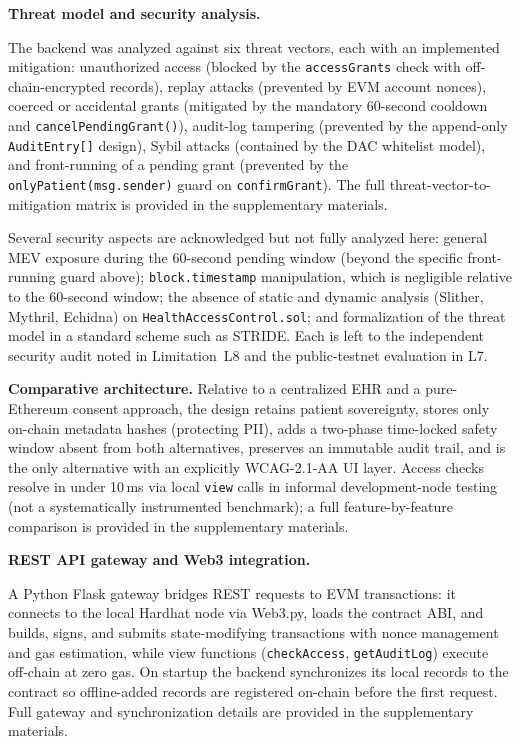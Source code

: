 \documentclass[journal,onecolumn]{IEEEtran}
\begin{document}
\noindent\textbf{Threat model and security analysis.}

The backend was analyzed against six threat vectors, each with an implemented mitigation: unauthorized access (blocked by the \texttt{accessGrants} check with off-chain-encrypted records), replay attacks (prevented by EVM account nonces), coerced or accidental grants (mitigated by the mandatory 60-second cooldown and \texttt{cancelPendingGrant()}), audit-log tampering (prevented by the append-only \texttt{AuditEntry[]} design), Sybil attacks (contained by the DAC whitelist model), and front-running of a pending grant (prevented by the \texttt{onlyPatient(msg.sender)} guard on \texttt{confirmGrant}). The full threat-vector-to-mitigation matrix is provided in the supplementary materials.

Several security aspects are acknowledged but not fully analyzed here: general MEV exposure during the 60-second pending window (beyond the specific front-running guard above); \texttt{block.timestamp} manipulation, which is negligible relative to the 60-second window; the absence of static and dynamic analysis (Slither, Mythril, Echidna) on \texttt{HealthAccessControl.sol}; and formalization of the threat model in a standard scheme such as STRIDE. Each is left to the independent security audit noted in Limitation~L8 and the public-testnet evaluation in L7.

\noindent\textbf{Comparative architecture.} Relative to a centralized EHR and a pure-Ethereum consent approach, the design retains patient sovereignty, stores only on-chain metadata hashes (protecting PII), adds a two-phase time-locked safety window absent from both alternatives, preserves an immutable audit trail, and is the only alternative with an explicitly WCAG-2.1-AA UI layer. Access checks resolve in under 10\,ms via local \texttt{view} calls in informal development-node testing (not a systematically instrumented benchmark); a full feature-by-feature comparison is provided in the supplementary materials.

\noindent\textbf{REST API gateway and Web3 integration.}

A Python Flask gateway bridges REST requests to EVM transactions: it connects to the local Hardhat node via Web3.py, loads the contract ABI, and builds, signs, and submits state-modifying transactions with nonce management and gas estimation, while view functions (\texttt{checkAccess}, \texttt{getAuditLog}) execute off-chain at zero gas. On startup the backend synchronizes its local records to the contract so offline-added records are registered on-chain before the first request. Full gateway and synchronization details are provided in the supplementary materials.
\end{document}
